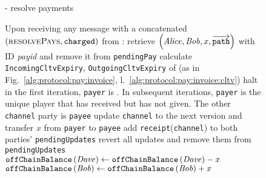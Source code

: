   \begin{figure}[H]
    \begin{systembox}{\fpaynet - resolve payments}
      \begin{algorithmic}[1]
        \State Upon receiving any message with a concatenated
        $\left(\textsc{resolvePays}, \mathtt{charged}\right)$ from \simulator:
        \Indent
              \State retrieve $\left(\mathit{Alice}, \mathit{Bob}, x,
              \overrightarrow{\mathtt{path}}\right)$ with ID \textit{payid} and
              remove it from \texttt{pendingPay}
              \State calculate \texttt{IncomingCltvExpiry},
              \texttt{OutgoingCltvExpiry} of \dave{} (as in
              Fig.~\ref{alg:protocol:pay:invoice},
              l.~\ref{alg:protocol:pay:invoice:cltv})
              \If{$\dave{} = \bot$}
                \State \Return
                \State halt
              \EndIf
                \State in the first iteration, \texttt{payer} is \dave. In
                subsequent iterations, \texttt{payer} is the unique player that
                has received but has not given. The other \texttt{channel} party
                is \texttt{payee}
                  \State update \texttt{channel} to the next version and
                  transfer $x$ from \texttt{payer} to \texttt{payee}
                  \State add \texttt{receipt}(\texttt{channel}) to both parties'
                  \texttt{pendingUpdates}
                \Else
                  \State revert all updates and remove them from
                  \texttt{pendingUpdates}
                \EndIf
              \EndFor
                \State $\mathtt{offChainBalance}\left(\mathit{Dave}\right) \gets
                \mathtt{offChainBalance}\left(\mathit{Dave}\right) - x$
              \EndIf
              \State $\mathtt{offChainBalance}\left(\mathit{Bob}\right) \gets
              \mathtt{offChainBalance}\left(\mathit{Bob}\right) + x$
            \EndFor
          \EndFor
        \EndIndent
      \end{algorithmic}
    \end{systembox}
    \caption{}
    \label{alg:fpaynet:resolvepay}
  \end{figure}

